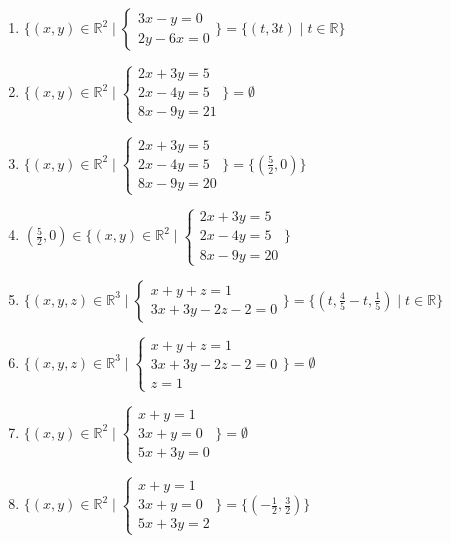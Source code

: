 \documentclass[11pt,a4paper]{article}
\begin{document}
\begin{enumerate}
\item $\displaystyle \{(x, y) \in \mathbb{R}^{2} \mid \begin{cases} 3x - y = 0 \\ 2y - 6x = 0 \end{cases}\} = \{(t, 3t) \mid t \in \mathbb{R}\}$
\item $\displaystyle \{(x, y) \in \mathbb{R}^{2} \mid \begin{cases} 2x + 3y = 5 \\ 2x - 4y = 5 \\ 8x - 9y = 21 \end{cases}\} = \emptyset$
\item $\displaystyle \{(x, y) \in \mathbb{R}^{2} \mid \begin{cases} 2x + 3y = 5 \\ 2x - 4y = 5 \\ 8x - 9y = 20 \end{cases}\} = \{(\frac{5}{2}, 0)\}$
\item $\displaystyle (\frac{5}{2}, 0) \in \{(x, y) \in \mathbb{R}^{2} \mid \begin{cases} 2x + 3y = 5 \\ 2x - 4y = 5 \\ 8x - 9y = 20 \end{cases}\}$
\item $\displaystyle \{(x, y, z) \in \mathbb{R}^{3} \mid \begin{cases} x + y + z = 1 \\ 3x + 3y - 2z - 2 = 0 \end{cases}\} = \{(t, \frac{4}{5} - t, \frac{1}{5}) \mid t \in \mathbb{R}\}$
\item $\displaystyle \{(x, y, z) \in \mathbb{R}^{3} \mid \begin{cases} x + y + z = 1 \\ 3x + 3y - 2z - 2 = 0 \\ z = 1 \end{cases}\} = \emptyset$
\item $\displaystyle \{(x, y) \in \mathbb{R}^{2} \mid \begin{cases} x + y = 1 \\ 3x + y = 0 \\ 5x + 3y = 0 \end{cases}\} = \emptyset$
\item $\displaystyle \{(x, y) \in \mathbb{R}^{2} \mid \begin{cases} x + y = 1 \\ 3x + y = 0 \\ 5x + 3y = 2 \end{cases}\} = \{(-\frac{1}{2}, \frac{3}{2})\}$

\end{enumerate}
\end{document}
